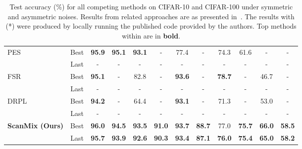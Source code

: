 \documentclass[review]{elsarticle}
\theoremstyle{plain}
\begin{document}
\begin{table*}[t!]
{\begin{tabular}{lc|cccc|cc||cccc}
\hline
 \multirow{2}{*}{PES~\citep{bai2021understanding}} & Best & \textbf{95.9} & \textbf{95.1} & \textbf{93.1} & - & 77.4 & - & 74.3 & 61.6 & 
 - & - \\
  & Last & - & - & - & - & - & - & - & - & - & - \\
\hline
 \multirow{2}{*}{FSR~\citep{zhang2021FSR}} & Best & \textbf{95.1} & - & 82.8 & - & \textbf{93.6} & - & \textbf{78.7} & - & 
 46.7 & - \\
  & Last & - & - & - & - & - & - & - & - & - & - \\
\hline
 \multirow{2}{*}{DRPL~\citep{ortego2019towards}} & Best & \textbf{94.2} & - & 64.4 & - & \textbf{93.1} & - & 71.3 & - & 
 53.0 & - \\
  & Last & - & - & - & - & - & - & - & - & - & - \\
\hline
\multirow{2}{*}{\textbf{ScanMix (Ours)}}& Best & \textbf{96.0} & \textbf{94.5} & \textbf{93.5} & \textbf{91.0} & \textbf{93.7} & \textbf{88.7} & 77.0 & \textbf{75.7} & \textbf{66.0} & \textbf{58.5}\\
    & Last & \textbf{95.7} & \textbf{93.9} & \textbf{92.6} & \textbf{90.3} & \textbf{93.4} & \textbf{87.1} & \textbf{76.0} & \textbf{75.4} & \textbf{65.0} & \textbf{58.2}\\
\hline
\end{tabular}
}
\caption{Test accuracy (\%) for all competing methods on CIFAR-10 and CIFAR-100 under symmetric and asymmetric noises. Results from related approaches are as presented in~\citep{li2020dividemix}. The results with (*) were produced by locally running the published code provided by the authors. Top methods within  are in \textbf{bold}.} 
\label{tab:results_cifar}
\end{table*}
\end{document}
